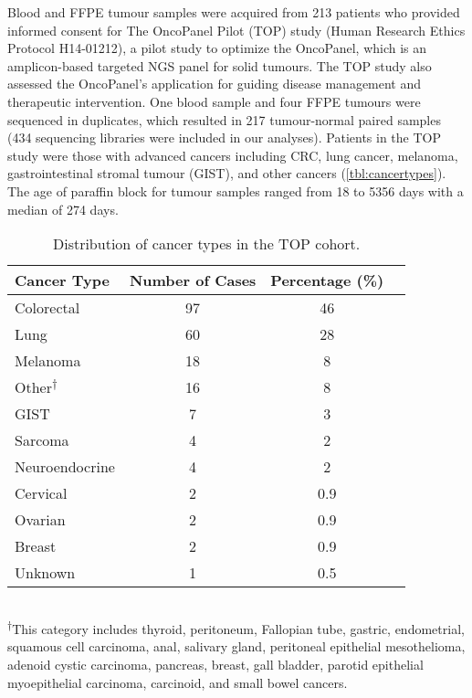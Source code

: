 Blood and FFPE tumour samples were acquired from 213 patients who provided informed consent for The OncoPanel Pilot (\acs{TOP}) study (Human Research Ethics Protocol H14­-01212), a pilot study to optimize the OncoPanel, which is an amplicon-based targeted NGS panel for solid tumours. The TOP study also assessed the OncoPanel's application for guiding disease management and therapeutic intervention. One blood sample and four FFPE tumours were sequenced in duplicates, which resulted in 217 tumour-normal paired samples (434 sequencing libraries were included in our analyses). Patients in the TOP study were those with advanced cancers including CRC, lung cancer, melanoma, gastrointestinal stromal tumour (\acs{GIST}), and other cancers (\autoref{tbl:cancertypes}). The age of paraffin block for tumour samples ranged from 18 to 5356 days with a median of 274 days.

\begin{table}[H]
\caption{Distribution of cancer types in the TOP cohort.}
\label{tbl:cancertypes}
\centering
      \begin{tabular}{lccc}
        \hline
        Cancer Type & Number of Cases & Percentage (\%) \\ \hline
        Colorectal & 97 & 46 \\
        Lung & 60 & 28 \\
        Melanoma & 18 & 8 \\
				Other\textsuperscript{$\dagger$} & 16 & 8 \\
				GIST & 7 & 3 \\
				Sarcoma & 4 & 2 \\
				Neuroendocrine & 4 & 2 \\
				Cervical & 2 & 0.9 \\
				Ovarian & 2 & 0.9 \\
				Breast & 2 & 0.9 \\
				Unknown & 1 & 0.5 \\ \hline
      \end{tabular} \\
			\vspace{0.5cm}
\justify
{\small \textsuperscript{$\dagger$}This category includes thyroid, peritoneum, Fallopian tube, gastric, endometrial, squamous cell carcinoma, anal, salivary gland, peritoneal epithelial mesothelioma, adenoid cystic carcinoma, pancreas, breast, gall bladder, parotid epithelial myoepithelial carcinoma, carcinoid, and small bowel cancers.}
\end{table}

